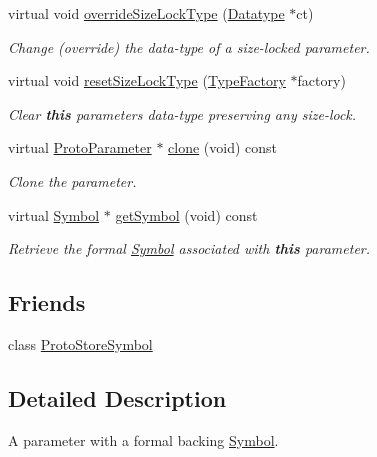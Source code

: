 \begin{DoxyCompactItemize}
virtual void \mbox{\hyperlink{class_parameter_symbol_a248a7be27fb94eeebe4628d623616a6d}{override\+Size\+Lock\+Type}} (\mbox{\hyperlink{class_datatype}{Datatype}} $\ast$ct)
\begin{DoxyCompactList}\small\item\em Change (override) the data-\/type of a {\itshape size-\/locked} parameter. \end{DoxyCompactList}\item 
virtual void \mbox{\hyperlink{class_parameter_symbol_a5cc33796ba27a4f9032fecbc20a65e28}{reset\+Size\+Lock\+Type}} (\mbox{\hyperlink{class_type_factory}{Type\+Factory}} $\ast$factory)
\begin{DoxyCompactList}\small\item\em Clear {\bfseries{this}} parameter\textquotesingle{}s data-\/type preserving any {\itshape size-\/lock}. \end{DoxyCompactList}\item 
virtual \mbox{\hyperlink{class_proto_parameter}{Proto\+Parameter}} $\ast$ \mbox{\hyperlink{class_parameter_symbol_a53389b2a06d6ee2bd0ece306a70dc360}{clone}} (void) const
\begin{DoxyCompactList}\small\item\em Clone the parameter. \end{DoxyCompactList}\item 
virtual \mbox{\hyperlink{class_symbol}{Symbol}} $\ast$ \mbox{\hyperlink{class_parameter_symbol_a4ad5640e944e78b0e02679503ee27534}{get\+Symbol}} (void) const
\begin{DoxyCompactList}\small\item\em Retrieve the formal \mbox{\hyperlink{class_symbol}{Symbol}} associated with {\bfseries{this}} parameter. \end{DoxyCompactList}\end{DoxyCompactItemize}
\subsection*{Friends}
\begin{DoxyCompactItemize}
\item 
class \mbox{\hyperlink{class_parameter_symbol_a14513e6f8d8efb1443e66390f3e19ffc}{Proto\+Store\+Symbol}}
\end{DoxyCompactItemize}


\subsection{Detailed Description}
A parameter with a formal backing \mbox{\hyperlink{class_symbol}{Symbol}}. 

